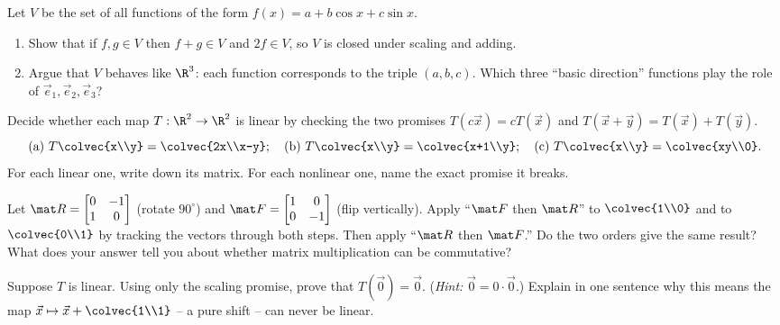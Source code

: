 \begin{exercise}
Let $V$ be the set of all functions of the form $f(x) = a + b\cos x + c\sin x$.
\begin{enumerate}
  \item Show that if $f,g\in V$ then $f+g\in V$ and $2f\in V$, so $V$ is closed under scaling and
  adding.
  \item Argue that $V$ behaves like $\R^3$: each function corresponds to the triple $(a,b,c)$. Which
  three ``basic direction'' functions play the role of $\vec e_1,\vec e_2,\vec e_3$?
\end{enumerate}
\end{exercise}

\begin{exercise}
Decide whether each map $T:\R^2\to\R^2$ is linear by checking the two promises $T(c\vec x)=cT(\vec x)$
and $T(\vec x+\vec y)=T(\vec x)+T(\vec y)$.
\[
\text{(a) } T\colvec{x\\y}=\colvec{2x\\x-y};\quad
\text{(b) } T\colvec{x\\y}=\colvec{x+1\\y};\quad
\text{(c) } T\colvec{x\\y}=\colvec{xy\\0}.
\]
For each linear one, write down its matrix. For each nonlinear one, name the exact promise it breaks.
\end{exercise}

\begin{exercise}
Let $\mat R=\begin{bmatrix}0&-1\\1&0\end{bmatrix}$ (rotate $90^\circ$) and
$\mat F=\begin{bmatrix}1&0\\0&-1\end{bmatrix}$ (flip vertically). Apply ``$\mat F$ then $\mat R$'' to
$\colvec{1\\0}$ and to $\colvec{0\\1}$ by tracking the vectors through both steps. Then apply
``$\mat R$ then $\mat F$.'' Do the two orders give the same result? What does your answer tell you
about whether matrix multiplication can be commutative?
\end{exercise}

\begin{exercise}
Suppose $T$ is linear. Using only the scaling promise, prove that $T(\vec 0) = \vec 0$.
(\emph{Hint:} $\vec 0 = 0\cdot\vec 0$.) Explain in one sentence why this means the map
$\vec x \mapsto \vec x + \colvec{1\\1}$ -- a pure shift -- can never be linear.
\end{exercise}

